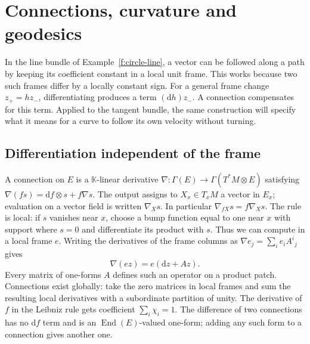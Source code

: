 \chapter{Connections, curvature and geodesics}\label{f:connections}

In the line bundle of Example~\ref{f:circle-line}, a vector can be followed along a path by keeping its coefficient constant in a local unit frame. This works because two such frames differ by a locally constant sign. For a general frame change $z_+=h z_-$, differentiating produces a term $(\mathrm dh)z_-$. A connection compensates for this term. Applied to the tangent bundle, the same construction will specify what it means for a curve to follow its own velocity without turning.

\section{Differentiation independent of the frame}

A connection on $E$ is a $\mathbb K$-linear derivative $\nabla:\Gamma(E)\to\Gamma(T^*M\otimes E)$ satisfying $\nabla(fs)=\mathrm df\otimes s+f\nabla s$. The output assigns to $X_x\in T_xM$ a vector in $E_x$; evaluation on a vector field is written $\nabla_Xs$. In particular $\nabla_{fX}s=f\nabla_Xs$. The rule is local: if $s$ vanishes near $x$, choose a bump function equal to one near $x$ with support where $s=0$ and differentiate its product with $s$. Thus we can compute in a local frame $e$. Writing the derivatives of the frame columns as $\nabla e_j=\sum_i e_i A^i{}_j$ gives
\[
 \nabla(e z)=e(\mathrm dz+A z).
\]
Every matrix of one-forms $A$ defines such an operator on a product patch. Connections exist globally: take the zero matrices in local frames and sum the resulting local derivatives with a subordinate partition of unity. The derivative of $f$ in the Leibniz rule gets coefficient $\sum_i\chi_i=1$. The difference of two connections has no $\mathrm df$ term and is an $\operatorname{End}(E)$-valued one-form; adding any such form to a connection gives another one.

